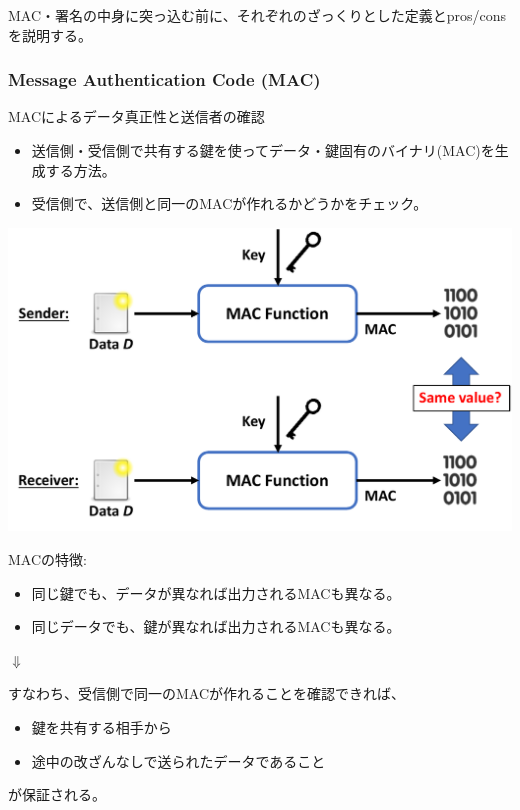 \documentclass[12pt,dvipdfmx]{beamer}
\begin{document}
\begin{frame}
MAC・署名の中身に突っ込む前に、それぞれのざっくりとした定義とpros/consを説明する。
\end{frame}

\begin{frame}
\frametitle{Message Authentication Code (MAC)}
\begin{block}{\small MACによるデータ真正性と送信者の確認}
\begin{itemize}
\item 送信側・受信側で共有する鍵を使って\alert{データ・鍵固有のバイナリ(MAC)}を生成する方法。
\item 受信側で、\alert{送信側と同一のMACが作れるかどうか}をチェック。
\end{itemize}
\end{block}
\begin{center}
 \includegraphics[width=0.7\linewidth]{Figs/mac-flow01.pdf}
\end{center}
\end{frame}
\begin{frame}
MACの特徴:
\begin{itemize}
 \item 同じ鍵でも、データが異なれば出力されるMACも異なる。
 \item 同じデータでも、鍵が異なれば出力されるMACも異なる。
\end{itemize}
\begin{center}
 $\Downarrow$
\end{center}
すなわち、受信側で同一のMACが作れることを確認できれば、\\
\begin{itemize}
 \item \alert{鍵を共有する相手}から
 \item \alert{途中の改ざんなしで送られたデータ}であること
\end{itemize}
が保証される。
\end{frame}
\end{document}
